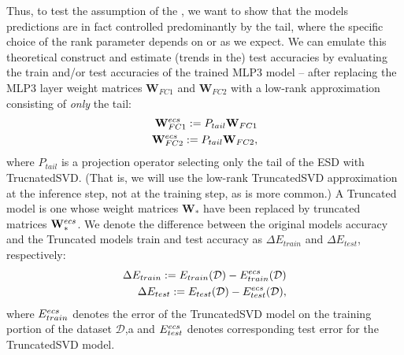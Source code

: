 Thus, to test the assumption of the \EffectiveCorrelationSpace, we want to show that the models predictions are in fact controlled predominantly by the tail, where the specific choice of the rank parameter depends on \HTSR or \SETOL as we expect.
We can emulate this theoretical construct and estimate (trends in the) test accuracies by evaluating the train and/or 
test accuracies of the trained MLP3 model -- after replacing the MLP3 layer weight matrices $\mathbf{W}_{FC1}$ and $\mathbf{W}_{FC2}$ with a low-rank approximation consisting of \emph{only} the tail:
\begin{align*}
 \mathbf{W}^{ecs}_{FC1}:= P_{tail}\mathbf{W}_{FC1} \\
 \mathbf{W}^{ecs}_{FC2}:= P_{tail}\mathbf{W}_{FC2}  ,
\end{align*}
where $P_{tail}$ is a projection operator selecting only the tail of the ESD with TrucnatedSVD.
(That is, we will use the  low-rank TruncatedSVD approximation at the inference step, not at the training step, as is more common.)
A Truncated model is one whose weight matrices $\mathbf{W}_*$ have been replaced by truncated matrices $\mathbf{W}^{ecs}_*$. 
We denote the difference between the original models accuracy and the Truncated models train and test accuracy as $\Delta E_{train}$ and $\Delta E_{test}$, respectively:
\begin{align*}
  \Delta E_{train}:=  E_{train}(\mathcal{D}) - E^{ecs}_{train}(\mathcal{D}) \\
  \Delta E_{test}:=  E_{test}(\mathcal{D}) - E^{ecs}_{test}(\mathcal{D})  ,
\end{align*}
where $E^{ecs}_{train}$ denotes the error of the TruncatedSVD model on the training portion of the dataset $\mathcal{D}$,a
and  $E^{ecs}_{test}$ denotes corresponding test error for the TruncatedSVD model.

